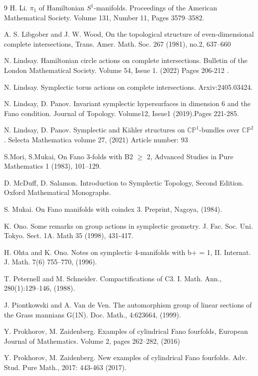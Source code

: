 \documentclass[12pt]{article}
\begin{document}
\begin{thebibliography}{9}
  H. Li. $\pi_1$ of Hamiltonian $S^1$-manifolds.  Proceedings of the American Mathematical Society. Volume 131, Number 11, Pages 3579–3582.




 A. S. Libgober and J. W. Wood, On the topological structure of even-dimensional complete intersections, Trans. Amer. Math. Soc. 267 (1981), no.2, 637–660


  N. Lindsay. Hamiltonian circle actions on complete intersections. Bulletin of the London Mathematical Society. Volume 54, Issue 1. (2022) Pages 206-212 .


 N. Lindsay. Symplectic torus actions on complete intersections. Arxiv:2405.03424.


N. Lindsay, D. Panov.  Invariant symplectic hypersurfaces in dimension $6$ and the Fano condition. Journal of Topology. Volume12, Issue1 (2019).Pages 221-285.


  N. Lindsay, D. Panov. Symplectic and K\"{a}hler structures on $\mathbb{CP}^{1}$-bundles over $\mathbb{CP}^{2}$. Selecta Mathematica volume 27, (2021) Article number: 93 


  S.Mori, S.Mukai, On Fano 3-folds with B2 $\geq$ 2, Advanced Studies in Pure Mathematics 1
 (1983), 101–129.

 D. McDuff, D. Salamon. Introduction to Symplectic Topology, Second Edition. Oxford Mathematical Monographs. 

 S. Mukai. On Fano manifolds with coindex $3$. Preprint, Nagoya, (1984).


 K. Ono. Some remarks on group actions in symplectic geometry. J. Fac. Soc. Uni. Tokyo. Sect. 1A. Math 35 (1998), 431-417.

 H. Ohta and K. Ono. Notes on symplectic 4-manifolds with b+ = 1, II. Internat. J. Math. 7(6) 755–770, (1996).


  T. Peternell and M. Schneider. Compactifications of C3. I. Math. Ann., 280(1):129–146, (1988). 

  J. Piontkowski and A. Van de Ven. The automorphism group of linear sections of the Grass
mannians G(1N). Doc. Math., 4:623664, (1999).


 Y. Prokhorov, M. Zaidenberg. Examples of cylindrical Fano fourfolds, European Journal of Mathematics. Volume 2, pages 262–282, (2016)


 Y. Prokhorov, M. Zaidenberg. New examples of cylindrical Fano fourfolds. Adv. Stud. Pure Math., 2017: 443-463 (2017).


\end{thebibliography}
\end{document}
